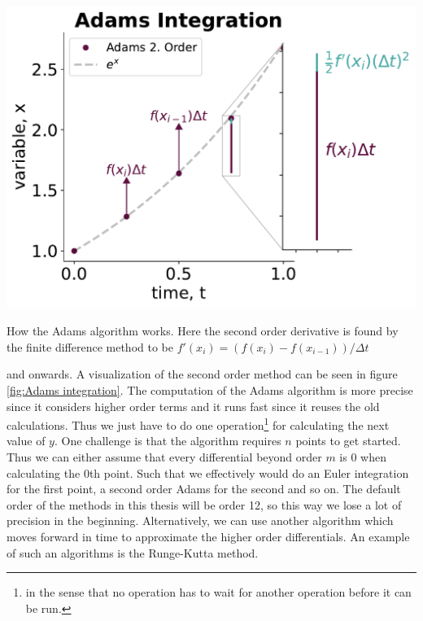 \begin{marginfigure}
    \centering
    \includegraphics[width = 1.2 \linewidth]{Figs/Theory/adams_intergation.pdf}
    \caption{How the Adams algorithm works. Here the second order derivative is found by the finite difference method to be $f'(x_i) = (f(x_i) - f(x_{i-1}))/\Delta t$}
    \label{fig:Adams integration}
\end{marginfigure}
and onwards. A visualization of the second order method can be seen in figure \ref{fig:Adams integration}. The computation of the Adams algorithm is more precise since it considers higher order terms and it runs fast since it reuses the old calculations. Thus we just have to do one operation\footnote{in the sense that no operation has to wait for another operation before it can be run.} for calculating the next value of $y$. One challenge is that the algorithm requires $n$ points to get started. Thus we can either assume that every differential beyond order $m$ is $0$ when calculating the $0$th point. Such that we effectively would do an Euler integration for the first point, a second order Adams for the second and so on. The default order of the methods in this thesis will be order 12, so this way we lose a lot of precision in the beginning. Alternatively, we can use another algorithm which moves forward in time to approximate the higher order differentials. An example of such an algorithms is the Runge-Kutta method.


